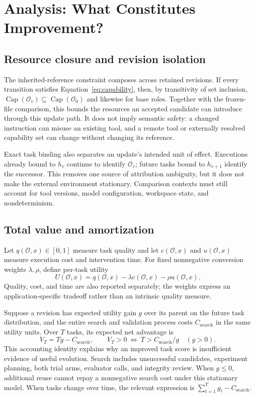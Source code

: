 \section{Analysis: What Constitutes Improvement?}\label{sec:analysis}
\subsection{Resource closure and revision isolation}
The inherited-reference constraint composes across retained revisions. If every transition satisfies Equation~\ref{eq:capability}, then, by transitivity of set inclusion, $\operatorname{Cap}(\mathcal O_v)\subseteq\operatorname{Cap}(\mathcal O_0)$ and likewise for base roles. Together with the frozen-file comparison, this bounds the resources an accepted candidate can introduce through this update path. It does not imply semantic safety: a changed instruction can misuse an existing tool, and a remote tool or externally resolved capability set can change without changing its reference.

Exact task binding also separates an update's intended unit of effect. Executions already bound to $h_v$ continue to identify $\mathcal O_v$; future tasks bound to $h_{v+1}$ identify the successor. This removes one source of attribution ambiguity, but it does not make the external environment stationary. Comparison contexts must still account for tool versions, model configuration, workspace state, and nondeterminism.

\subsection{Total value and amortization}
Let $q(\mathcal O,x)\in[0,1]$ measure task quality and let $c(\mathcal O,x)$ and $u(\mathcal O,x)$ measure execution cost and intervention time. For fixed nonnegative conversion weights $\lambda,\rho$, define per-task utility
\begin{equation}
U(\mathcal O,x)=q(\mathcal O,x)-\lambda c(\mathcal O,x)-\rho u(\mathcal O,x).
\label{eq:utility}
\end{equation}
Quality, cost, and time are also reported separately; the weights express an application-specific tradeoff rather than an intrinsic quality measure.

Suppose a revision has expected utility gain $g$ over its parent on the future task distribution, and the entire search and validation process costs $C_{\mathrm{search}}$ in the same utility units. Over $T$ tasks, its expected net advantage is
\begin{equation}
V_T=Tg-C_{\mathrm{search}},\qquad
V_T>0\ \Longleftrightarrow\ T>C_{\mathrm{search}}/g\quad(g>0).
\label{eq:amortization}
\end{equation}
This accounting identity explains why an improved task score is insufficient evidence of useful evolution. Search includes unsuccessful candidates, experiment planning, both trial arms, evaluator calls, and integrity review. When $g\leq0$, additional reuse cannot repay a nonnegative search cost under this stationary model. When tasks change over time, the relevant expression is $\sum_{t=1}^{T}g_t-C_{\mathrm{search}}$.

